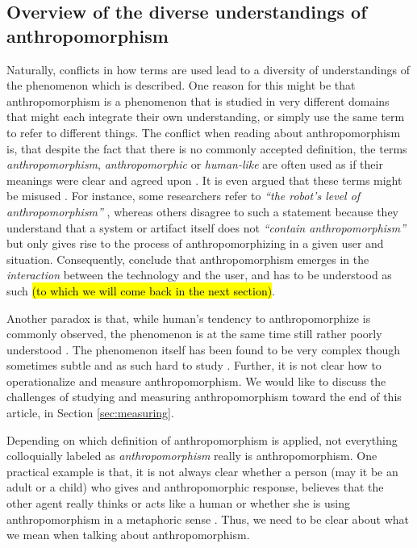 \documentclass{frontiersSCNS} %
\newcommand{\eg}{{\textit{e.g.~}}}
\begin{document}

\subsection{Overview of the diverse understandings of anthropomorphism}

Naturally, conflicts in how terms are used lead to a diversity of understandings of the phenomenon which is described.
One reason for this might be that anthropomorphism
is a phenomenon that is studied in very different domains that might each
integrate their own understanding, or simply use the same term to refer to different things.
The conflict when reading about anthropomorphism is, that despite the fact that there is no commonly accepted definition, the terms
\textit{anthropomorphism}, \textit{anthropomorphic} or \textit{human-like} are
often used as if their meanings were clear and agreed upon
\citep{persson_anthropomorphism_2000}. It is even
argued that these terms might be misused \citep{duffy_anthropomorphism_2002,epley_when_2008}.
For instance, some researchers refer to \textit{``the
robot's level of anthropomorphism''} \cite{bartneck_is_2007}, whereas others
disagree to such a statement because they understand that a system or artifact itself does not \textit{``contain anthropomorphism''} but only gives rise to the process of anthropomorphizing in a
given user and situation. Consequently, \cite{persson_anthropomorphism_2000} conclude that
anthropomorphism emerges in the \textit{interaction} between the technology and
the user, and has to be understood as such \hl{(to which we will come back in the next section)}. 


Another paradox is that, while human's tendency to anthropomorphize is commonly observed, the phenomenon is 
at the same time still rather poorly understood
\cite{epley_seeing_2007}. The phenomenon itself has been found to be very complex though sometimes
subtle and as such hard to study \cite{duffy_anthropomorphism_2002,epley_when_2008}. Further, it is not clear how to operationalize and measure anthropomorphism. We would like to discuss the challenges of studying and measuring anthropomorphism toward the end of this article, in Section \ref{sec:measuring}.

Depending on which definition of anthropomorphism is applied, not everything 
colloquially labeled as \emph{anthropomorphism} really is anthropomorphism.
One practical example is that, it is not always clear whether a person (may it be an adult or 
a child) who gives and anthropomorphic response, believes that the other agent really 
thinks or acts like a human or whether she is using anthropomorphism in a metaphoric 
sense \citep{leeds_childrens_1992}.
Thus, we need to be clear about what we mean when talking about anthropomorphism. 
\end{document}
